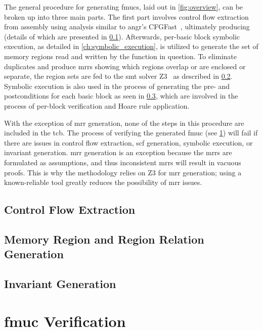 The general procedure for generating \acp{fmuc}, laid out in \cref{fig:overview},
can be broken up into three main parts.
The first part involves control flow extraction from assembly using  analysis
similar to angr's CFGFast~\citep{shoshitaishvili2016state},
ultimately producing  (details of which are presented
in \cref{sse:cfg_extract}).
Afterwards, per-basic block symbolic execution,
as detailed in \cref{ch:symbolic_execution},
is utilized to generate the set of memory regions
read and written by the function in question.
To eliminate duplicates and produce \acp{mrr}
showing which regions overlap or are enclosed or separate,
the region sets are fed to the \ac{smt} solver Z3~\citep{de2008z3}
as described in \cref{sse:mem_reg}.
Symbolic execution is also used in the process of generating
the pre- and postconditions for each basic block as seen in \cref{sse:inv_gen},
which are involved in the process of per-block verification
and Hoare rule application.

With the exception of \ac{mrr} generation,
none of the steps in this procedure are included in the \ac{tcb}.
The process of verifying the generated \ac{fmuc} (see \cref{se:fmuc_ver})
will fail if there are issues in control flow extraction,
\ac{scf} generation, symbolic execution, or invariant generation.
\Ac{mrr} generation is an exception
because the \acp{mrr} are formulated as assumptions,
and thus inconsistent \acp{mrr} will result in vacuous proofs.
This is why the methodology relies on Z3 for \ac{mrr} generation;
using a known-reliable tool greatly reduces the possibility of \ac{mrr} issues.

\subsection{Control Flow Extraction}\label{sse:cfg_extract}
\subsection{Memory Region and Region Relation Generation}\label{sse:mem_reg}
\subsection{Invariant Generation}\label{sse:inv_gen}

\section{\acs*{fmuc} Verification}\label{se:fmuc_ver}
